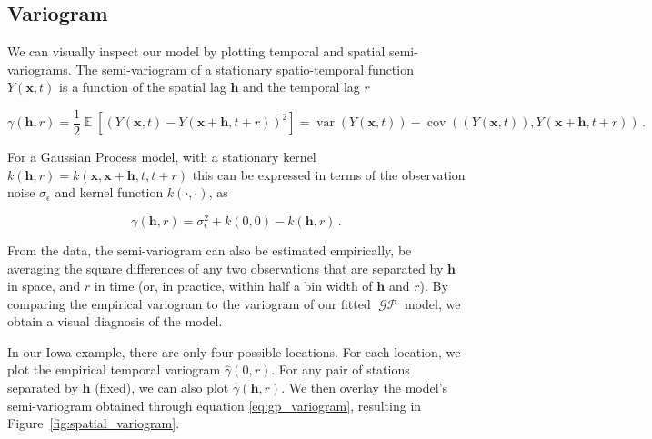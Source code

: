 \documentclass[letter]{article}
\newcommand{\genericdel}[3]{%
      \left#1#3\right#2
    }
\newcommand{\del}[1]{\genericdel(){#1}}
\newcommand{\sbr}[1]{\genericdel[]{#1}}
\DeclareMathOperator{\E}{\mathbb{E}}
\DeclareMathOperator{\cov}{{cov}}
\DeclareMathOperator{\var}{{var}}
\DeclareMathOperator{\GP}{\mathcal{GP}}
\newcommand{\xvec}{\mathbold{x}}
\newcommand{\hvec}{\mathbold{h}}
\newcommand{\sigman}{\sigma_{\epsilon}}
\begin{document}
\subsection{Variogram}\label{variogram}

We can visually inspect our model by plotting temporal and spatial semi-variograms. The semi-variogram of a stationary spatio-temporal function \(Y(\xvec,t)\) is a function of the spatial lag \(\hvec\) and the temporal lag \(r\)

\begin{equation}
    \gamma\del{\hvec,r} = \frac{1}{2} \E\sbr{\del{Y\del{\xvec,t}-Y\del{\xvec+\hvec,t+r}}^2} = \var\del{ Y\del{\xvec,t}} - \cov\del{ \del{Y\del{\xvec,t}} , Y\del{\xvec+\hvec,t+r}}\,.
\end{equation}

For a Gaussian Process model, with a stationary kernel \(k(\hvec,r)=k(\xvec,\xvec+\hvec,t,t+r)\) this can be expressed in terms of the observation noise \(\sigman\) and kernel function \(k(\cdot,\cdot)\), as

\begin{equation}
    \label{eq:gp_variogram}
    \gamma\del{\hvec,r} = \sigman^2 + k\del{0,0} - k(\hvec,r)\,.
\end{equation}

From the data, the semi-variogram can also be estimated empirically, be averaging the square differences of any two observations that are separated by \(\hvec\) in space, and \(r\) in time (or, in practice, within half a bin width of \(\hvec\) and \(r\)). By comparing the empirical variogram to the variogram of our fitted \(\GP\) model, we obtain a visual diagnosis of the model.

In our Iowa example, there are only four possible locations. For each location, we plot the empirical temporal variogram \(\hat\gamma\del{0,r}\). For any pair of stations separated by \(\hvec\) (fixed), we can also plot \(\hat\gamma\del{\hvec,r}\). We then overlay the model's semi-variogram obtained through equation \eqref{eq:gp_variogram}, resulting in Figure~\ref{fig:spatial_variogram}.
\end{document}
